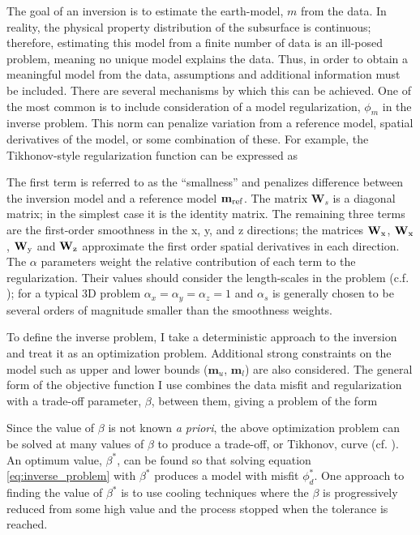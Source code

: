 The goal of an inversion is to estimate the earth-model, $m$ from the data. In reality, the physical property distribution of the subsurface is continuous; therefore, estimating this model from a finite number of data is an ill-posed problem, meaning no unique model explains the data. Thus, in order to obtain a meaningful model from the data, assumptions and additional information must be included. There are several mechanisms by which this can be achieved. One of the most common is to include consideration of a model regularization, $\phi_m$ in the inverse problem. This norm can penalize variation from a reference model, spatial derivatives of the model, or some combination of these. For example, the Tikhonov-style regularization function can be expressed as

The first term is referred to as the ``smallness'' and penalizes difference between the inversion model and a reference model $\mathbf{m_{\rm ref}}$. The matrix $\mathbf{W}_s$ is a diagonal matrix; in the simplest case it is the identity matrix. The remaining three terms are the first-order smoothness in the x, y, and z directions; the matrices $\mathbf{W}_{\rm x}$, $\mathbf{W}_{\rm x}$, $\mathbf{W}_{\rm y}$ and $\mathbf{W}_{\rm z}$ approximate the first order spatial derivatives in each direction. The $\alpha$ parameters weight the relative contribution of each term to the regularization. Their values should consider the length-scales in the problem (c.f. \cite{Oldenburg2005}); for a typical 3D problem $\alpha_x = \alpha_y = \alpha_z = 1$ and $\alpha_s$ is generally chosen to be several orders of magnitude smaller than the smoothness weights.

To define the inverse problem, I take a deterministic approach to the inversion and treat it as an optimization problem. Additional strong constraints on the model such as upper and lower bounds ($\mathbf{m}_u$, $\mathbf{m}_l$) are also considered. The general form of the objective function I use combines the data misfit and regularization with a trade-off parameter, $\beta$, between them, giving a problem of the form

Since the value of $\beta$ is not known \emph{a priori}, the above optimization problem can be solved at many values of $\beta$ to produce a trade-off, or Tikhonov, curve (cf. \cite{Parker1994}). An optimum value, $\beta^*$, can be found so that solving equation \ref{eq:inverse_problem} with $\beta^*$ produces a model with misfit $\phi_d^*$. One approach to finding the value of $\beta^*$ is to use cooling techniques where the $\beta$ is progressively reduced from some high value and the process stopped when the tolerance is reached.

